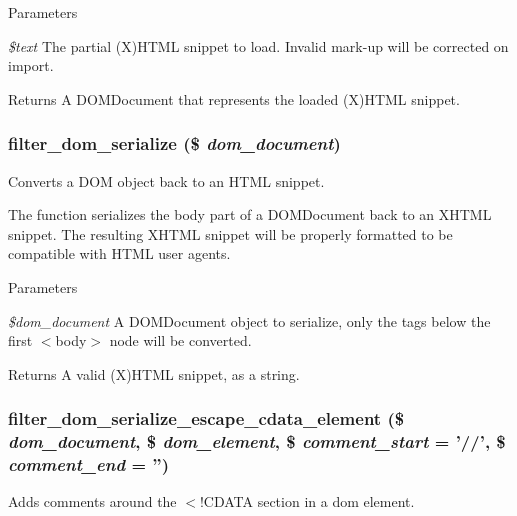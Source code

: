 \begin{DoxyParams}{Parameters}
\item[{\em \$text}]The partial (X)HTML snippet to load. Invalid mark-\/up will be corrected on import. \end{DoxyParams}
\begin{DoxyReturn}{Returns}
A DOMDocument that represents the loaded (X)HTML snippet. 
\end{DoxyReturn}
\hypertarget{filter_8module_a4502a9064a1eb7680ff5371b05342ec8}{
\subsubsection[{filter\_\-dom\_\-serialize}]{\setlength{\rightskip}{0pt plus 5cm}filter\_\-dom\_\-serialize (\$ {\em dom\_\-document})}}
\label{filter_8module_a4502a9064a1eb7680ff5371b05342ec8}
Converts a DOM object back to an HTML snippet.

The function serializes the body part of a DOMDocument back to an XHTML snippet. The resulting XHTML snippet will be properly formatted to be compatible with HTML user agents.


\begin{DoxyParams}{Parameters}
\item[{\em \$dom\_\-document}]A DOMDocument object to serialize, only the tags below the first $<$body$>$ node will be converted.\end{DoxyParams}
\begin{DoxyReturn}{Returns}
A valid (X)HTML snippet, as a string. 
\end{DoxyReturn}
\hypertarget{filter_8module_ad379f826b57d932f08d696282728217c}{
\subsubsection[{filter\_\-dom\_\-serialize\_\-escape\_\-cdata\_\-element}]{\setlength{\rightskip}{0pt plus 5cm}filter\_\-dom\_\-serialize\_\-escape\_\-cdata\_\-element (\$ {\em dom\_\-document}, \/  \$ {\em dom\_\-element}, \/  \$ {\em comment\_\-start} = {\ttfamily '//'}, \/  \$ {\em comment\_\-end} = {\ttfamily ''})}}
\label{filter_8module_ad379f826b57d932f08d696282728217c}
Adds comments around the $<$!CDATA section in a dom element.

